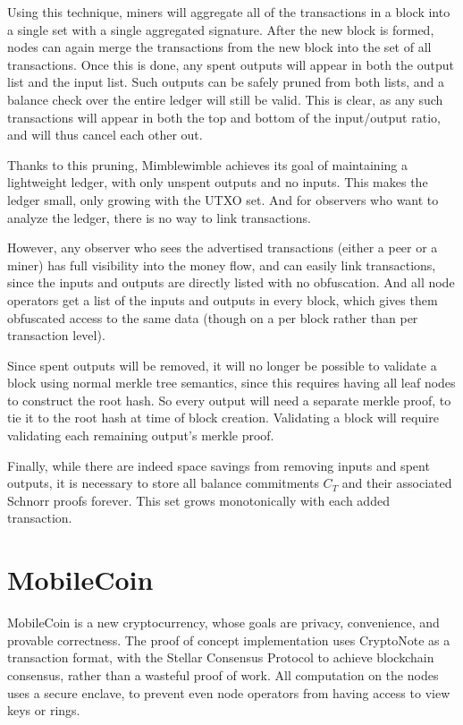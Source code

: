 \documentclass{article}
\begin{document}
Using this technique, miners will aggregate all of the transactions in a block into a single set with a single aggregated signature.  After the new block is formed, nodes can again merge the transactions from the new block into the set of all transactions.  Once this is done, any spent outputs will appear in both the output list and the input list.  Such outputs can be safely pruned from both lists, and a balance check over the entire ledger will still be valid.  This is clear, as any such transactions will appear in both the top and bottom of the input/output ratio, and will thus cancel each other out.  

Thanks to this pruning, Mimblewimble achieves its goal of maintaining a lightweight ledger, with only unspent outputs and no inputs.  This makes the ledger small, only growing with the UTXO set.  And for observers who want to analyze the ledger, there is no way to link transactions.

However, any observer who sees the advertised transactions (either a peer or a miner) has full visibility into the money flow, and can easily link transactions, since the inputs and outputs are directly listed with no obfuscation.  And all node operators get a list of the inputs and outputs in every block, which gives them obfuscated access to the same data (though on a per block rather than per transaction level).

Since spent outputs will be removed, it will no longer be possible to validate a block using normal merkle tree semantics, since this requires having all leaf nodes to construct the root hash.  So every output will need a separate merkle proof, to tie it to the root hash at time of block creation.  Validating a block will require validating each remaining output's merkle proof.

Finally, while there are indeed space savings from removing inputs and spent outputs, it is necessary to store all balance commitments $C_T$ and their associated Schnorr proofs forever.  This set grows monotonically with each added transaction.  



\section{MobileCoin}

MobileCoin is a new cryptocurrency, whose goals are privacy, convenience, and provable correctness.  The proof of concept implementation uses CryptoNote as a transaction format, with the Stellar Consensus Protocol to achieve blockchain consensus, rather than a wasteful proof of work.  All computation on the nodes uses a secure enclave, to prevent even node operators from having access to view keys or rings.  
\end{document}
